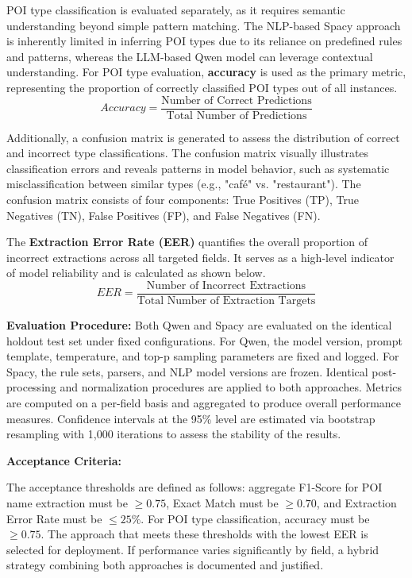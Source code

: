 \documentclass[a4paper,12pt]{report}
\begin{document}
POI type classification is evaluated separately, as it requires semantic understanding beyond simple pattern matching. The NLP-based Spacy approach is inherently limited in inferring POI types due to its reliance on predefined rules and patterns, whereas the LLM-based Qwen model can leverage contextual understanding. For POI type evaluation, \textbf{accuracy} is used as the primary metric, representing the proportion of correctly classified POI types out of all instances.
\begin{equation}
Accuracy = \frac{\text{Number of Correct Predictions}}{\text{Total Number of Predictions}}
\end{equation}

Additionally, a confusion matrix is generated to assess the distribution of correct and incorrect type classifications. The confusion matrix visually illustrates classification errors and reveals patterns in model behavior, such as systematic misclassification between similar types (e.g., "café" vs. "restaurant"). The confusion matrix consists of four components: True Positives (TP), True Negatives (TN), False Positives (FP), and False Negatives (FN).

The \textbf{Extraction Error Rate (EER)} quantifies the overall proportion of incorrect extractions across all targeted fields. It serves as a high-level indicator of model reliability and is calculated as shown below.
\begin{equation}
EER = \frac{\text{Number of Incorrect Extractions}}{\text{Total Number of Extraction Targets}}
\end{equation}

\textbf{Evaluation Procedure:} Both Qwen and Spacy are evaluated on the identical holdout test set under fixed configurations. For Qwen, the model version, prompt template, temperature, and top-p sampling parameters are fixed and logged. For Spacy, the rule sets, parsers, and NLP model versions are frozen. Identical post-processing and normalization procedures are applied to both approaches. Metrics are computed on a per-field basis and aggregated to produce overall performance measures. Confidence intervals at the 95\% level are estimated via bootstrap resampling with 1,000 iterations to assess the stability of the results.

\textbf{Acceptance Criteria:}

The acceptance thresholds are defined as follows: aggregate F1-Score for POI name extraction must be $\ge 0.75$, Exact Match must be $\ge 0.70$, and Extraction Error Rate must be $\le 25\%$. For POI type classification, accuracy must be $\ge 0.75$. The approach that meets these thresholds with the lowest EER is selected for deployment. If performance varies significantly by field, a hybrid strategy combining both approaches is documented and justified.
\end{document}
